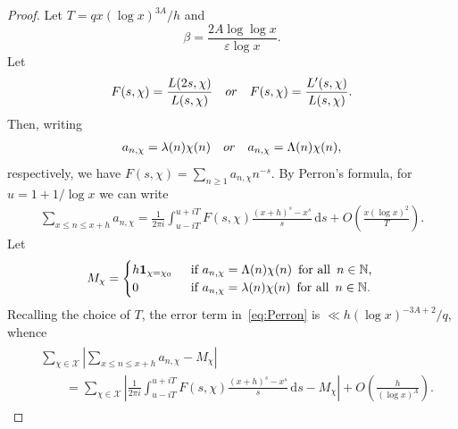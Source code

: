 \documentclass[11pt,letterpaper]{amsart}
\renewcommand{\leq}{\leqslant}
\renewcommand{\geq}{\geqslant}
\renewcommand{\d}{\mathrm{d}}
\theoremstyle{definition}
\numberwithin{equation}{section}
\newcommand{\0}{\mathbf{0}}
\begin{document}
\begin{proof}
Let 
$T=qx(\log x)^{3A}/h$ 
 and    
\begin{equation}\label{eq:beta-defn}
\beta=\frac{2A\log \log x}{\varepsilon\log x}.
\end{equation}
Let 
$$F(s,\chi)=\frac{L(2s,\chi)}{L(s,\chi)}\quad \textnormal{or} \quad F(s,\chi)=\frac{L'(s,\chi)}{L(s,\chi)}.$$
Then, writing
\begin{align*}
a_{n,\chi}=\lambda(n)\chi(n)\quad \textnormal{or}\quad  a_{n,\chi}=\Lambda(n)\chi(n),
\end{align*}
respectively, we have $F(s,\chi)=\sum_{n\geq 1}a_{n,\chi}n^{-s}$.  By Perron's formula, for $u=1+1/\log x$ we can write
\begin{align}\label{eq:Perron}
\sum_{x\leq n\leq x+h}
a_{n,\chi}=\frac{1}{2\pi i}\int_{u-iT}^{u+iT}F(s,\chi)
\frac{(x+h)^s-x^s}{s}\, \d s+O\left(\frac{x(\log x)^2}{T}\right).
\end{align}
Let \begin{align}
\label{eq:M}
M_{\chi}=\begin{cases}h\mathbf{1}_{\chi=\chi_0} 
&\,\text{ if $a_{n,\chi}=\Lambda(n)\chi(n)$\,
for all\, $n\in \mathbb N$,
}\\
0 &\,\text{ if $a_{n,\chi}=\lambda(n)\chi(n)$\,
for all\, $n\in \mathbb N$.}
\end{cases}
\end{align}
Recalling the choice of $T$, the error term in~\eqref{eq:Perron} is $\ll h(\log x)^{-3A+2}/q$,
whence
\begin{align}\begin{split}\label{eq:Fintegral}
&\sum_{\chi\in \mathcal{X}}\left|\sum_{x\leq n\leq x+h}
a_{n,\chi}-M_{\chi}\right| \\
&\qquad = \sum_{\chi\in \mathcal{X}}\left|\frac{1}{2\pi i} \int_{u-iT}^{u+iT}F(s,\chi)
\frac{(x+h)^s-x^s}{s}\, \d s -M_{\chi}\right|+O\left(\frac{h}{(\log x)^{A}}\right).
\end{split}
\end{align}


\end{proof}
\end{document}
